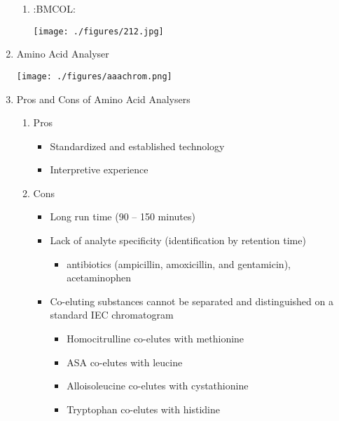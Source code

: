 \documentclass{scrartcl}
\begin{document}
\begin{enumerate}
\begin{enumerate}
\item :BMCOL:
\label{sec:org7692a2b}
\begin{center}
\texttt{[image: ./figures/212.jpg]}
\end{center}
\end{enumerate}

\item Amino Acid Analyser
\label{sec:org98a5291}

\begin{center}
\texttt{[image: ./figures/aaachrom.png]}
\end{center}

\item Pros and Cons of Amino Acid Analysers
\label{sec:orga5cd676}

\begin{enumerate}
\item Pros
\label{sec:orga0d6bfe}
\begin{itemize}
\item Standardized and established technology
\item Interpretive experience
\end{itemize}
\item Cons
\label{sec:org65d6f0b}
\begin{itemize}
\item Long run time (90 – 150 minutes)
\item Lack of analyte specificity (identification by retention time)
\begin{itemize}
\item antibiotics (ampicillin, amoxicillin, and gentamicin), acetaminophen
\end{itemize}
\item Co-eluting substances cannot be separated and distinguished on a standard IEC chromatogram
\begin{itemize}
\item Homocitrulline co-elutes with methionine
\item ASA co-elutes with leucine
\item Alloisoleucine co-elutes with cystathionine
\item Tryptophan co-elutes with histidine
\end{itemize}
\end{itemize}
\end{enumerate}
\end{enumerate}
\end{document}
